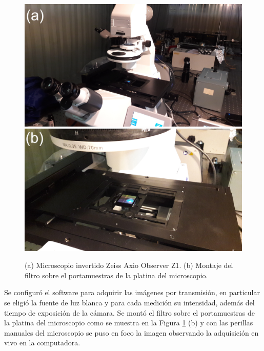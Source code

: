 \begin{figure}[H]
	\centering
	\includegraphics[scale=0.1]{Figs/defectosZEISS/b.jpg}
	\includegraphics[scale=0.1]{Figs/defectosZEISS/a.jpg}
	\caption{(a) Microscopio invertido Zeiss Axio Observer Z1. (b) Montaje del filtro sobre el portamuestras de la platina del microscopio.}
	\label{fig:filtroenZEISS}
\end{figure}

Se configuró el software para adquirir las imágenes por transmisión, en particular se eligió la fuente de luz blanca y para cada medición su intensidad, además del tiempo de exposición de la cámara. Se montó el filtro sobre el portamuestras de la platina del microscopio como se muestra en la Figura \ref{fig:filtroenZEISS} (b) y con las perillas manuales del microscopio se puso en foco la imagen observando la adquisición en vivo en la computadora. 





